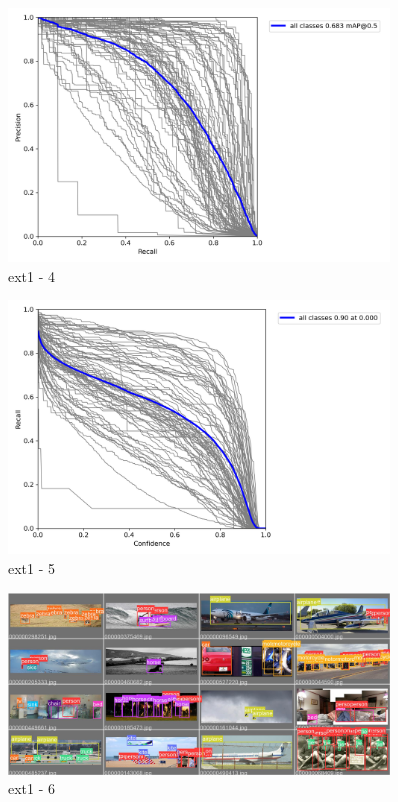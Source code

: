 \documentclass[10pt,UTF8]{ctexart}
\begin{document}
\begin{figure}[H]
\centering 
\includegraphics[width=0.90\textwidth]{ex14.png} 
\caption{ext1 - 4}
\label{Test}
\end{figure}

\begin{figure}[H]
\centering 
\includegraphics[width=0.90\textwidth]{ex15.png} 
\caption{ext1 - 5}
\label{Test}
\end{figure}

\begin{figure}[H]
\centering 
\includegraphics[width=0.90\textwidth]{ex16.jpg} 
\caption{ext1 - 6}
\label{Test}
\end{figure}
\end{document}
